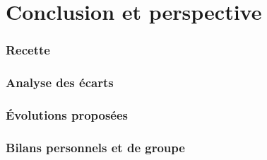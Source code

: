 \part{Conclusion et perspective}
\section{Recette}
\section{Analyse des écarts}
\section{Évolutions proposées}
\section{Bilans personnels et de groupe}

